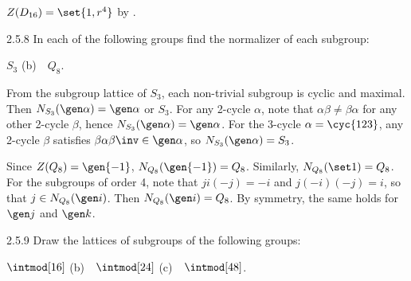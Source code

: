 \begin{sol}
    $Z(D_{16}) = \set{1, r^4}$ by .
\end{sol}

\begin{exercise}{2.5.8}
    In each of the following groups find the normalizer of each subgroup:
    \begin{subexercises}
        \item $S_3$ \quad (b)~~$Q_8$.
    \end{subexercises}
\end{exercise}

\begin{solenum}
    \item From the subgroup lattice of $S_3$, each non-trivial subgroup is cyclic and maximal.
	Then $N_{S_3}(\gen\alpha) = \gen\alpha$ or $S_3$.
	For any 2-cycle $\alpha$, note that $\alpha\beta \neq \beta\alpha$ for any other 2-cycle $\beta$, hence $N_{S_3}(\gen\alpha) = \gen\alpha$.
	For the 3-cycle $\alpha = \cyc{1 2 3}$, any 2-cycle $\beta$ satisfies $\beta\alpha\beta\inv \in \gen\alpha$, so $N_{S_3}(\gen\alpha) = S_3$.
    \item Since $Z(Q_8) = \gen{-1}$, $N_{Q_8}(\gen{-1}) = Q_8$.
	Similarly, $N_{Q_8}(\set 1) = Q_8$.
	For the subgroups of order 4, note that $ji(-j) = -i$ and $j(-i)(-j) = i$, so that $j \in N_{Q_8}(\gen i)$.
	Then $N_{Q_8}(\gen i) = Q_8$.
	By symmetry, the same holds for $\gen j$ and $\gen k$.
\end{solenum}

\begin{exercise}{2.5.9}
    Draw the lattices of subgroups of the following groups:
    \begin{subexercises}
        \item $\intmod[16]$ \quad (b)~~$\intmod[24]$ \quad (c)~~$\intmod[48]$.
    \end{subexercises}
\end{exercise}


